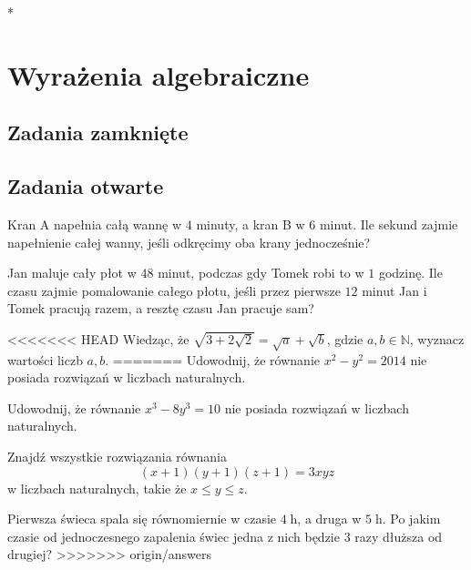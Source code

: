 *\setcounter{parc}{0}
\addtocounter{chapc}{1}

\chapter{Wyrażenia algebraiczne}

\section{Zadania zamknięte}

\section{Zadania otwarte}

\zadanie Kran A napełnia całą wannę w $4$ minuty, a kran B w $6$ minut. Ile sekund zajmie napełnienie całej wanny, jeśli odkręcimy oba krany jednocześnie?

\zadanie Jan maluje cały płot w $48$ minut, podczas gdy Tomek robi to w $1$ godzinę. Ile czasu zajmie pomalowanie całego płotu, jeśli przez pierwsze $12$ minut Jan i Tomek pracują razem, a resztę czasu Jan pracuje sam?

<<<<<<< HEAD
\zadanie Wiedząc, że $\sqrt{3 + 2\sqrt{2}} = \sqrt{a} + \sqrt{b}$, gdzie $a, b \in \mathbb{N}$, wyznacz wartości liczb $a, b$. %
=======
\zadanie Udowodnij, że równanie $x^2 - y^2 = 2014$ nie posiada rozwiązań w liczbach naturalnych.

\zadanie Udowodnij, że równanie $x^3 - 8y^3 = 10$ nie posiada rozwiązań w liczbach naturalnych.

\zadanie Znajdź wszystkie rozwiązania równania \[{(x + 1)(y + 1)(z + 1) = 3xyz}\] w liczbach naturalnych, takie że $x \leqslant y \leqslant z$.

\zadanie Pierwsza świeca spala się równomiernie w czasie $4\;$h, a druga w $5\;$h. Po jakim czasie od jednoczesnego zapalenia świec jedna z nich będzie $3$ razy dłuższa od drugiej? %
>>>>>>> origin/answers
